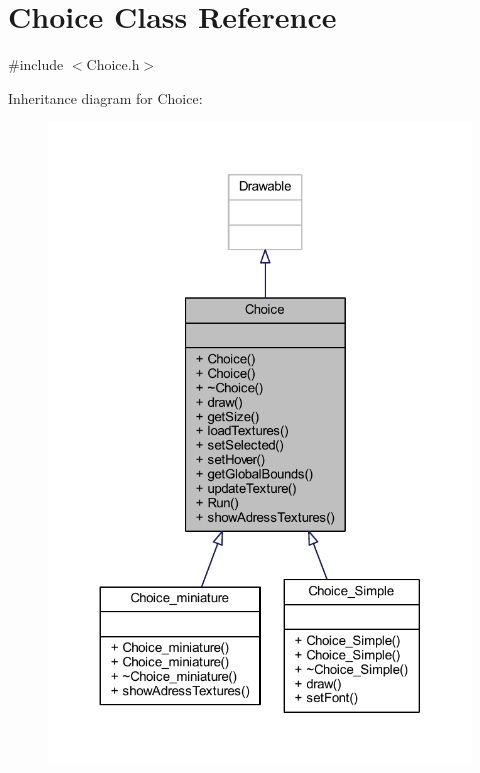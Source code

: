\hypertarget{class_choice}{}\section{Choice Class Reference}
\label{class_choice}


{\ttfamily \#include $<$Choice.\+h$>$}



Inheritance diagram for Choice\+:
\nopagebreak
\begin{figure}[H]
\begin{center}
\leavevmode
\includegraphics[width=324pt]{class_choice__inherit__graph}
\end{center}
\end{figure}


